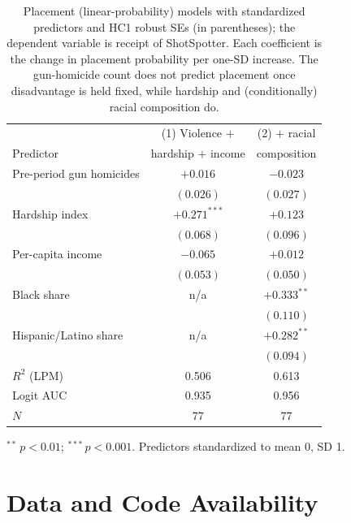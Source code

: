 \documentclass[12pt]{article}
\begin{document}
\begin{table}[H]
\centering
\small
\caption{Placement (linear-probability) models with standardized predictors and HC1 robust
SEs (in parentheses); the dependent variable is receipt of ShotSpotter. Each coefficient is
the change in placement probability per one-SD increase. The gun-homicide count does not
predict placement once disadvantage is held fixed, while hardship and (conditionally) racial
composition do.}
\label{tab:placement}
\begin{tabular}{lcc}
\toprule
                        & (1) Violence $+$      & (2) $+$ racial \\
Predictor               & hardship $+$ income   & composition \\
\midrule
Pre-period gun homicides & $+0.016$        & $-0.023$ \\
                         & $(0.026)$       & $(0.027)$ \\
Hardship index           & $+0.271^{***}$  & $+0.123$ \\
                         & $(0.068)$       & $(0.096)$ \\
Per-capita income        & $-0.065$        & $+0.012$ \\
                         & $(0.053)$       & $(0.050)$ \\
Black share              & n/a             & $+0.333^{**}$ \\
                         &                 & $(0.110)$ \\
Hispanic/Latino share    & n/a             & $+0.282^{**}$ \\
                         &                 & $(0.094)$ \\
\midrule
$R^2$ (LPM)              & 0.506 & 0.613 \\
Logit AUC                & 0.935 & 0.956 \\
$N$                      & 77 & 77 \\
\bottomrule
\end{tabular}

\vspace{0.3em}
{\footnotesize $^{**}\,p<0.01$; $^{***}\,p<0.001$. Predictors standardized to mean 0, SD 1.}
\end{table}

\section*{Data and Code Availability}
\end{document}
